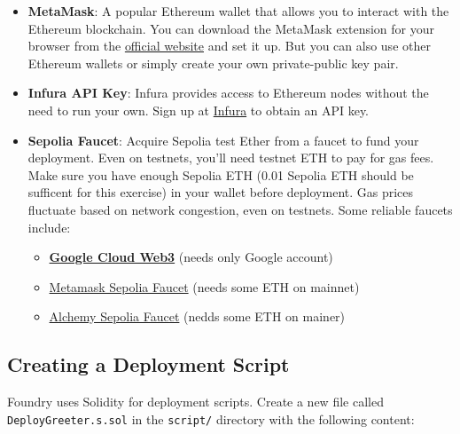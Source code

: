 \documentclass[12pt]{article}
\begin{document}
\begin{itemize}
    \item \textbf{MetaMask}: A popular Ethereum wallet that allows you to interact with the Ethereum blockchain. You can download the MetaMask extension for your browser from the \href{https://metamask.io/}{official website} and set it up. But you can also use other Ethereum wallets or simply create your own private-public key pair.
    
    \item \textbf{Infura API Key}: Infura provides access to Ethereum nodes without the need to run your own. Sign up at \href{https://infura.io/}{Infura} to obtain an API key.
    
    \item \textbf{Sepolia Faucet}: Acquire Sepolia test Ether from a faucet to fund your deployment. Even on testnets, you'll need testnet ETH to pay for gas fees. Make sure you have enough Sepolia ETH (0.01 Sepolia ETH should be sufficent for this exercise) in your wallet before deployment. Gas prices fluctuate based on network congestion, even on testnets. Some reliable faucets include:
    \begin{itemize}
        \item \href{https://cloud.google.com/application/web3/faucet/ethereum/sepolia}{\textbf{Google Cloud Web3}} (needs only Google account)
        \item \href{https://docs.metamask.io/developer-tools/faucet/}{Metamask Sepolia Faucet} (needs some ETH on mainnet)
        \item \href{https://www.alchemy.com/faucets/ethereum-sepolia}{Alchemy Sepolia Faucet} (nedds some ETH on mainer)
    \end{itemize}
\end{itemize}


\subsection{Creating a Deployment Script}

Foundry uses Solidity for deployment scripts. Create a new file called \texttt{DeployGreeter.s.sol} in the \texttt{script/} directory with the following content:
\end{document}
